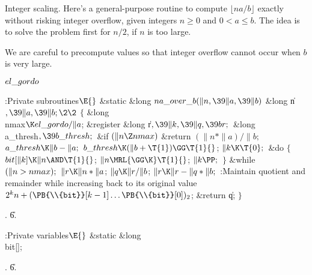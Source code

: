 Integer scaling.
Here's a general-purpose routine to compute $\lfloor na/b\rfloor$ exactly
without risking integer overflow, given integers $n\ge0$ and $0<a\le b$.
The idea is to solve the problem first for $n/2$, if $n$ is too large.

We are careful to precompute values so that integer overflow cannot
occur when $b$ is very large.

\Y\B\4\D$\\{el\_gordo}$ \5
\par
\Y\B\4:Private subroutines\X${}\E{}$\6
\1\1\&{static} \&{long} ${}\\{na\_over\_b}(\|n,\39\|a,\39\|b){}$\6
\&{long} \|n${},\39\|a,\39\|b;\2\2{}$\6
${}\{{}$\5
\1\&{long} \\{nmax}${}\K\\{el\_gordo}/\|a{}$;\6
\&{register} \&{long} \|r${},\39\|k,\39\|q,\39\\{br};{}$\6
\&{long} \\{a\_thresh}${},\39\\{b\_thresh};{}$\7
\&{if} ${}(\|n\Z\\{nmax}){}$\1\5
\&{return} ${}(\|n*\|a)/\|b;{}$\2\6
${}\\{a\_thresh}\K\|b-\|a;{}$\6
${}\\{b\_thresh}\K(\|b+\T{1})\GG\T{1}{}$;\6
${}\|k\K\T{0};{}$\6
\&{do}\5
${}\{{}$\5
\1${}\\{bit}[\|k]\K\|n\AND\T{1}{}$;\6
${}\|n\MRL{{\GG}{\K}}\T{1}{}$;\6
${}\|k\PP;{}$\6
\4${}\}{}$\5
\2\5
\&{while} ${}(\|n>\\{nmax});{}$\6
${}\|r\K\|n*\|a{}$;\5
${}\|q\K\|r/\|b{}$;\5
${}\|r\K\|r-\|q*\|b;{}$\6
:Maintain quotient  and remainder  while increasing  back to its original value $2^kn+(\PB{\\{bit}}[k-1]\ldots \PB{%
\\{bit}}[0])_2$\X;\6
\&{return} \|q;\6
\4${}\}{}$\2\par
{}.
\U6.\fi

\B{}:Private variables\X${}\E{}$\6
\&{static} \&{long} \\{bit}[];\par
{}.
\U6.\fi

